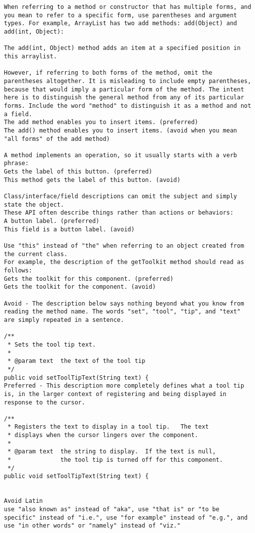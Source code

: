 \begin{lstlisting}
When referring to a method or constructor that has multiple forms, and you mean to refer to a specific form, use parentheses and argument types. For example, ArrayList has two add methods: add(Object) and add(int, Object):

The add(int, Object) method adds an item at a specified position in this arraylist.

However, if referring to both forms of the method, omit the parentheses altogether. It is misleading to include empty parentheses, because that would imply a particular form of the method. The intent here is to distinguish the general method from any of its particular forms. Include the word "method" to distinguish it as a method and not a field.
The add method enables you to insert items. (preferred)
The add() method enables you to insert items. (avoid when you mean "all forms" of the add method)

A method implements an operation, so it usually starts with a verb phrase:
Gets the label of this button. (preferred)
This method gets the label of this button. (avoid)

Class/interface/field descriptions can omit the subject and simply state the object.
These API often describe things rather than actions or behaviors:
A button label. (preferred)
This field is a button label. (avoid)

Use "this" instead of "the" when referring to an object created from the current class.
For example, the description of the getToolkit method should read as follows:
Gets the toolkit for this component. (preferred)
Gets the toolkit for the component. (avoid)

Avoid - The description below says nothing beyond what you know from reading the method name. The words "set", "tool", "tip", and "text" are simply repeated in a sentence.

/**
 * Sets the tool tip text.
 *
 * @param text  the text of the tool tip
 */
public void setToolTipText(String text) {
Preferred - This description more completely defines what a tool tip is, in the larger context of registering and being displayed in response to the cursor.

/**
 * Registers the text to display in a tool tip.   The text 
 * displays when the cursor lingers over the component.
 *
 * @param text  the string to display.  If the text is null, 
 *              the tool tip is turned off for this component.
 */
public void setToolTipText(String text) {


Avoid Latin
use "also known as" instead of "aka", use "that is" or "to be specific" instead of "i.e.", use "for example" instead of "e.g.", and use "in other words" or "namely" instead of "viz."


\end{lstlisting}
